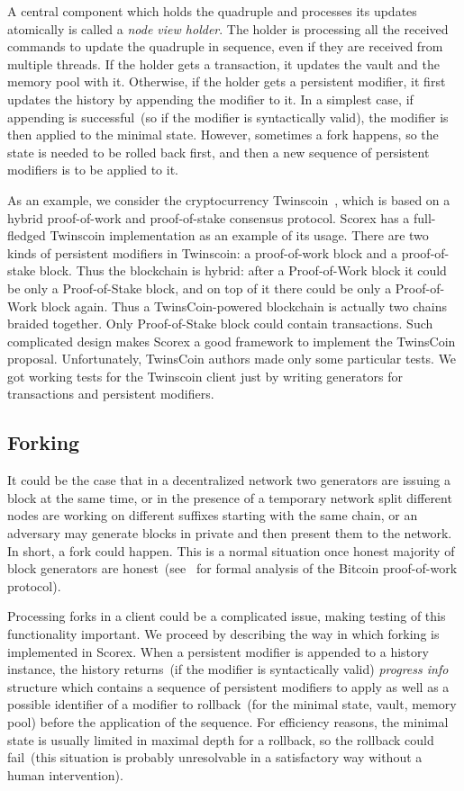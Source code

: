 A central component which holds the quadruple {\em <history, minimal state, vault, memory pool>} and processes its updates atomically is called a {\em node view holder}. The holder is processing all the received commands to update the quadruple in sequence, even if they are received from multiple threads. If the holder gets a transaction, it updates the vault and the memory pool with it. Otherwise, if the holder gets a persistent modifier, it first updates the history by appending the modifier to it. In a simplest case, if appending is successful~(so if the modifier is syntactically valid), the modifier is then applied to the minimal state. However, sometimes a fork happens, so the state is needed to be rolled back first, and then a new sequence of persistent modifiers is to be applied to it. 

As an example, we consider the cryptocurrency Twinscoin~\cite{cryptoeprint:2017:232}, which is based on a hybrid proof-of-work and proof-of-stake consensus protocol. Scorex has a full-fledged Twinscoin implementation as an example of its usage. There are two kinds of persistent modifiers in Twinscoin: a proof-of-work block and a proof-of-stake block. Thus the blockchain is hybrid: after a Proof-of-Work block it could be only a Proof-of-Stake block, and on top of it there could be only a Proof-of-Work block again. Thus a TwinsCoin-powered blockchain is actually two chains braided together. Only Proof-of-Stake block could contain transactions. Such complicated design makes Scorex a good framework to implement the TwinsCoin proposal. Unfortunately, TwinsCoin authors made only some particular tests. We got working tests for the Twinscoin client just by writing generators for transactions and persistent modifiers.

\subsection{Forking}
\label{sec:forking}

It could be the case that in a decentralized network two generators are issuing a block at the same time, or in the presence of a temporary network split different nodes are working on different suffixes starting with the same chain, or an adversary may generate blocks in private and then present them to the network. In short, a fork could happen. This is a normal situation once honest majority of block generators are honest~(see~\cite{Garay2015} for formal analysis of the Bitcoin proof-of-work protocol).    

Processing forks in a client could be a complicated issue, making testing of this functionality important. We proceed by describing the way in which forking is implemented in Scorex. When a persistent modifier is appended to a history instance, the history returns~(if the modifier is syntactically valid) {\em progress info} structure which contains a sequence of persistent modifiers to apply as well as a possible identifier of a modifier to rollback~(for the minimal state, vault, memory pool) before the application of the sequence. For efficiency reasons, the minimal state is usually limited in maximal depth for a rollback, so the rollback could fail~(this situation is probably unresolvable in a satisfactory way without a human intervention). 
